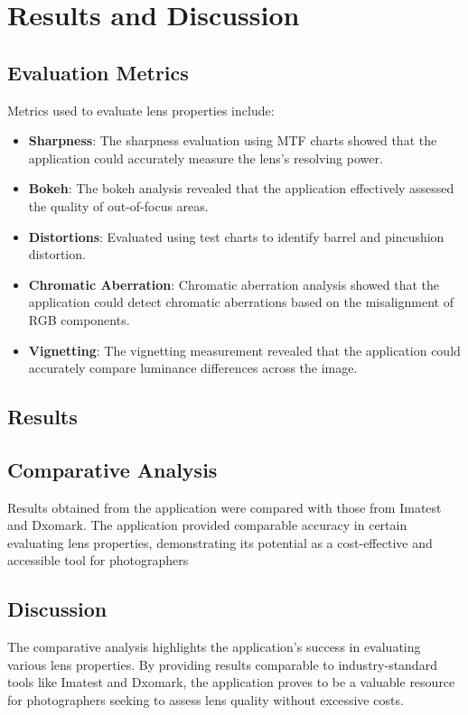 \chapter{Results and Discussion}
\section{Evaluation Metrics}
Metrics used to evaluate lens properties include:
\begin{itemize}
    \item \textbf{Sharpness}: The sharpness evaluation using MTF charts showed that the application could accurately measure the lens's resolving power.
    \item \textbf{Bokeh}: The bokeh analysis revealed that the application effectively assessed the quality of out-of-focus areas.
    \item \textbf{Distortions}: Evaluated using test charts to identify barrel and pincushion distortion.
    \item \textbf{Chromatic Aberration}: Chromatic aberration analysis showed that the application could detect chromatic aberrations based on the misalignment of RGB components.
    \item \textbf{Vignetting}: The vignetting measurement revealed that the application could accurately compare luminance differences across the image.
\end{itemize}

\section{Results}
\section{Comparative Analysis}
Results obtained from the application were compared with those from Imatest and Dxomark. The application provided comparable accuracy in certain evaluating lens properties, demonstrating its potential as a cost-effective and accessible tool for photographers

\section{Discussion}
The comparative analysis highlights the application's success in evaluating various lens properties. By providing results comparable to industry-standard tools like Imatest and Dxomark, the application proves to be a valuable resource for photographers seeking to assess lens quality without excessive costs.

